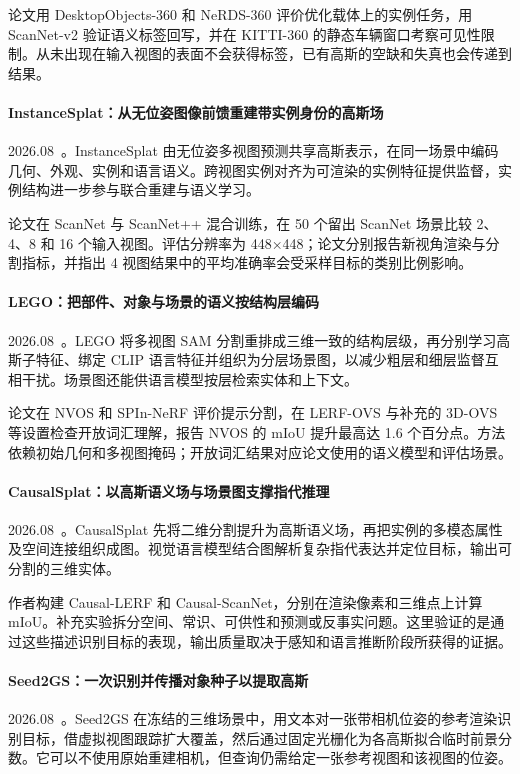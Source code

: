 论文用 DesktopObjects-360 和 NeRDS-360 评价优化载体上的实例任务，用 ScanNet-v2 验证语义标签回写，并在 KITTI-360 的静态车辆窗口考察可见性限制。从未出现在输入视图的表面不会获得标签，已有高斯的空缺和失真也会传递到结果。

\paragraph{InstanceSplat：从无位姿图像前馈重建带实例身份的高斯场}
2026.08~\cite{2608_07144}。InstanceSplat 由无位姿多视图预测共享高斯表示，在同一场景中编码几何、外观、实例和语言语义。跨视图实例对齐为可渲染的实例特征提供监督，实例结构进一步参与联合重建与语义学习。

论文在 ScanNet 与 ScanNet++ 混合训练，在 50 个留出 ScanNet 场景比较 2、4、8 和 16 个输入视图。评估分辨率为 448×448；论文分别报告新视角渲染与分割指标，并指出 4 视图结果中的平均准确率会受采样目标的类别比例影响。

\paragraph{LEGO：把部件、对象与场景的语义按结构层编码}
2026.08~\cite{2608_10057}。LEGO 将多视图 SAM 分割重排成三维一致的结构层级，再分别学习高斯子特征、绑定 CLIP 语言特征并组织为分层场景图，以减少粗层和细层监督互相干扰。场景图还能供语言模型按层检索实体和上下文。

论文在 NVOS 和 SPIn-NeRF 评价提示分割，在 LERF-OVS 与补充的 3D-OVS 等设置检查开放词汇理解，报告 NVOS 的 mIoU 提升最高达 1.6 个百分点。方法依赖初始几何和多视图掩码；开放词汇结果对应论文使用的语义模型和评估场景。

\paragraph{CausalSplat：以高斯语义场与场景图支撑指代推理}
2026.08~\cite{2608_11150}。CausalSplat 先将二维分割提升为高斯语义场，再把实例的多模态属性及空间连接组织成图。视觉语言模型结合图解析复杂指代表达并定位目标，输出可分割的三维实体。

作者构建 Causal-LERF 和 Causal-ScanNet，分别在渲染像素和三维点上计算 mIoU。补充实验拆分空间、常识、可供性和预测或反事实问题。这里验证的是通过这些描述识别目标的表现，输出质量取决于感知和语言推断阶段所获得的证据。

\paragraph{Seed2GS：一次识别并传播对象种子以提取高斯}
2026.08~\cite{2608_11928}。Seed2GS 在冻结的三维场景中，用文本对一张带相机位姿的参考渲染识别目标，借虚拟视图跟踪扩大覆盖，然后通过固定光栅化为各高斯拟合临时前景分数。它可以不使用原始重建相机，但查询仍需给定一张参考视图和该视图的位姿。

